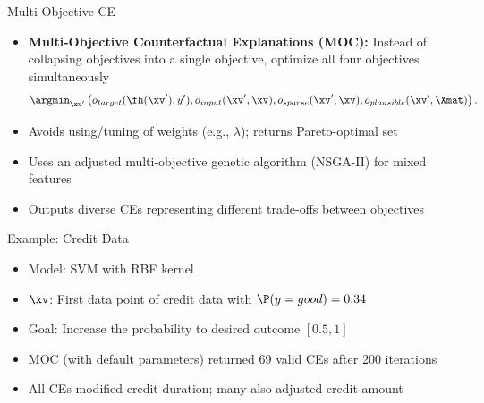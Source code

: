 \documentclass[11pt,compress,t,notes=noshow, aspectratio=169, xcolor=table]{beamer}
\begin{document}
\begin{frame}{Multi-Objective CE }
	\begin{itemize}
		\item \textbf{Multi-Objective Counterfactual Explanations (MOC):} Instead of collapsing objectives into a single objective, optimize all four objectives simultaneously
	$$	\argmin_{\xv'} \left(o_{target}(\fh(\xv'), y'), o_{input}(\xv', \xv), o_{sparse}(\xv', \xv), o_{plausible}(\xv', \Xmat) \right). $$
		
		\item Avoids using/tuning of weights (e.g., \(\lambda\)); returns Pareto-optimal set
		\item Uses an adjusted multi-objective genetic algorithm (NSGA-II) for mixed features %
		\item Outputs diverse CEs representing different trade-offs between objectives
	\end{itemize}

\end{frame}

\begin{frame}{Example: Credit Data}
	\begin{itemize}
		\item Model: SVM with RBF kernel
		\item $\xv$: First data point of credit data with $\P(y = good)  = 0.34$ %
		\item Goal: Increase the probability to desired outcome $[0.5, 1]$
		\item MOC (with default parameters) returned 69 valid CEs after 200 iterations%
		\item All CEs modified credit duration; many also adjusted credit amount
	\end{itemize}
\end{frame}
\end{document}
